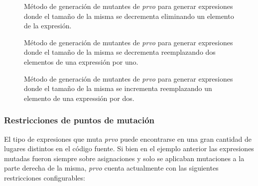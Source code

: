 \begin{figure}
	
	\caption{M\'etodo de generaci\'on de mutantes de \emph{prvo} para generar expresiones donde el tama\~no de la misma se decrementa eliminando un elemento de la expresi\'on.}
	\label{figures.code.prvoMethods.decreaseLength}
\end{figure}

\begin{figure}
	
	\caption{M\'etodo de generaci\'on de mutantes de \emph{prvo} para generar expresiones donde el tama\~no de la misma se decrementa reemplazando dos elementos de una expressi\'on por uno.}
	\label{figures.code.prvoMethods.twoByOne}
\end{figure}

\begin{figure}
	
	\caption{M\'etodo de generaci\'on de mutantes de \emph{prvo} para generar expresiones donde el tama\~no de la misma se incrementa reemplazando un elemento de una expressi\'on por dos.}
	\label{figures.code.prvoMethods.oneByTwo}
\end{figure}

\subsubsection{Restricciones de puntos de mutaci\'on}

El tipo de expresiones que muta \emph{prvo} puede encontrarse en una gran cantidad de lugares distintos en el c\'odigo fuente. Si bien en el ejemplo anterior las expresiones mutadas fueron siempre sobre asignaciones y solo se aplicaban mutaciones a la parte derecha de la misma, \emph{prvo} cuenta actualmente con las siguientes restricciones configurables:

